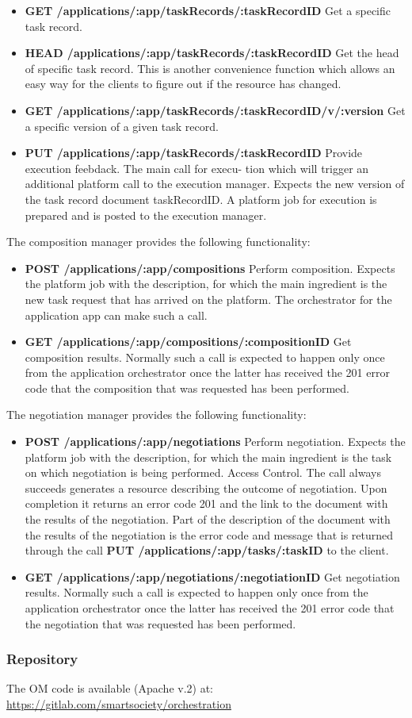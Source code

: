 \begin{itemize}
\item {\bf GET /applications/:app/taskRecords/:taskRecordID} Get a specific task record.
\item {\bf HEAD /applications/:app/taskRecords/:taskRecordID} Get the head of specific task record. This is another convenience function which allows an easy way for the clients to figure out if the resource has changed.
\item {\bf GET /applications/:app/taskRecords/:taskRecordID/v/:version} Get a specific version of a given task record.
\item {\bf PUT /applications/:app/taskRecords/:taskRecordID} Provide execution feebdack. The main call for execu- tion which will trigger an additional platform call to the execution manager. Expects the new version of the task record document taskRecordID. A platform job for execution is prepared and is posted to the execution manager.
\end{itemize}
The composition manager provides the following functionality:
\begin{itemize}
\item {\bf POST /applications/:app/compositions} Perform composition. Expects the platform job with the description, for which the main ingredient is the new task request that has arrived on the platform. The orchestrator for the application app can make such a call.
\item {\bf GET /applications/:app/compositions/:compositionID} Get composition results.  Normally such a call is expected to happen only once from the application orchestrator once the latter has received the 201 error code that the composition that was requested has been performed.
\end{itemize}
The negotiation manager provides the following functionality:
\begin{itemize}
\item {\bf POST /applications/:app/negotiations} Perform negotiation. Expects the platform job with the description, for which the main ingredient is the task on which negotiation is being performed.
Access Control. The call always succeeds generates a resource describing the outcome of negotiation. Upon completion it returns an error code 201 and the link to the document with the results of the negotiation. Part of the description of the document with the results of the negotiation is the error code and message that is returned through the call {\bf PUT /applications/:app/tasks/:taskID} to the client.
\item {\bf GET /applications/:app/negotiations/:negotiationID} Get negotiation results. Normally such a call is expected to happen only once from the application orchestrator once the latter has received the 201 error code that the negotiation that was requested has been performed.
\end{itemize}
\subsubsection{Repository}
The OM code is available (Apache v.2) at: \url{https://gitlab.com/smartsociety/orchestration}